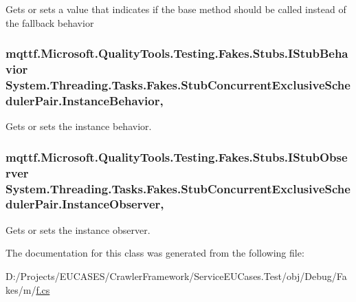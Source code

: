 Gets or sets a value that indicates if the base method should be called instead of the fallback behavior

\hypertarget{class_system_1_1_threading_1_1_tasks_1_1_fakes_1_1_stub_concurrent_exclusive_scheduler_pair_ada1f9b4ffd5db3e0cb41cf4635faf4d0}{
\subsubsection[{Instance\-Behavior}]{\setlength{\rightskip}{0pt plus 5cm}mqttf.\-Microsoft.\-Quality\-Tools.\-Testing.\-Fakes.\-Stubs.\-I\-Stub\-Behavior System.\-Threading.\-Tasks.\-Fakes.\-Stub\-Concurrent\-Exclusive\-Scheduler\-Pair.\-Instance\-Behavior\hspace{0.3cm}{\ttfamily [get]}, {\ttfamily [set]}}}\label{class_system_1_1_threading_1_1_tasks_1_1_fakes_1_1_stub_concurrent_exclusive_scheduler_pair_ada1f9b4ffd5db3e0cb41cf4635faf4d0}


Gets or sets the instance behavior.

\hypertarget{class_system_1_1_threading_1_1_tasks_1_1_fakes_1_1_stub_concurrent_exclusive_scheduler_pair_aa3e4f6a0f8c49c661ee3b35c4cb3a322}{
\subsubsection[{Instance\-Observer}]{\setlength{\rightskip}{0pt plus 5cm}mqttf.\-Microsoft.\-Quality\-Tools.\-Testing.\-Fakes.\-Stubs.\-I\-Stub\-Observer System.\-Threading.\-Tasks.\-Fakes.\-Stub\-Concurrent\-Exclusive\-Scheduler\-Pair.\-Instance\-Observer\hspace{0.3cm}{\ttfamily [get]}, {\ttfamily [set]}}}\label{class_system_1_1_threading_1_1_tasks_1_1_fakes_1_1_stub_concurrent_exclusive_scheduler_pair_aa3e4f6a0f8c49c661ee3b35c4cb3a322}


Gets or sets the instance observer.



The documentation for this class was generated from the following file\-:\begin{DoxyCompactItemize}
\item 
D\-:/\-Projects/\-E\-U\-C\-A\-S\-E\-S/\-Crawler\-Framework/\-Service\-E\-U\-Cases.\-Test/obj/\-Debug/\-Fakes/m/\hyperlink{m_2f_8cs}{f.\-cs}\end{DoxyCompactItemize}
